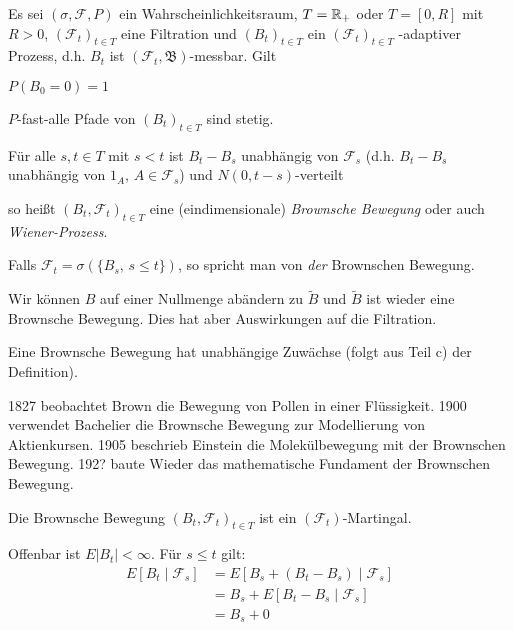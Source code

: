 \documentclass[a4paper,twoside,DIV15,BCOR12mm]{scrbook}
\newcommand{\cF}{\mathcal F}
\newcommand{\borel}{{\mathfrak B}}
\begin{document}
\begin{definition}
Es sei $(\sigma,\cF,P)$ ein Wahrscheinlichkeitsraum, $T=\mathbb{R}_+$ oder $T=[0,R]$ mit $R>0$, $(\cF_t)_{t\in T}$ eine Filtration und $(B_t)_{t\in T}$ ein $(\cF_t)_{t\in T}$
-adaptiver Prozess, d.h. $B_t$ ist $(\cF_t,\borel)$-messbar. Gilt 
\begin{enuma}
\item $P(B_0=0)=1$
\item $P$-fast-alle Pfade von $(B_t)_{t\in T}$ sind stetig.
\item Für alle $s,t\in T$ mit $s<t$ ist $B_t-B_s$ unabhängig von $\cF_s$ (d.h. $B_t-B_s$ unabhängig von $1_A$, $A\in \cF_s$) und $N(0,t-s)$-verteilt
\end{enuma}
so heißt $(B_t,\cF_t)_{t\in T}$ eine (eindimensionale) \emph{Brownsche Bewegung} oder auch \emph{Wiener-Prozess}.
\end{definition}

\begin{bemerkung}
\begin{enuma}
\item Falls $\cF_t = \sigma(\{B_s,\, s\le t\})$, so spricht man von \emph{der} Brownschen Bewegung.
\item Wir können $B$ auf einer Nullmenge abändern zu $\tilde B$ und $\tilde B$ ist wieder eine Brownsche Bewegung. Dies hat aber Auswirkungen auf die Filtration.
\item Eine Brownsche Bewegung hat unabhängige Zuwächse (folgt aus Teil c) der Definition).
\item 1827 beobachtet Brown die Bewegung von Pollen in einer Flüssigkeit. 1900 verwendet Bachelier die Brownsche Bewegung zur Modellierung von Aktienkursen. 1905 beschrieb Einstein die Molekülbewegung mit der Brownschen Bewegung. 192? baute Wieder das mathematische Fundament der Brownschen Bewegung.
\end{enuma}
\end{bemerkung}

\begin{lemma}
Die Brownsche Bewegung $(B_t,\cF_t)_{t\in T}$ ist ein $(\cF_t)$-Martingal.
\end{lemma}

\begin{beweis}
Offenbar ist $E|B_t|<\infty$. Für $s\le t$ gilt:
\begin{align*}
E[B_t\mid \cF_s] &= E[B_s + (B_t - B_s) \mid \cF_s] \\
&= B_s + E[B_t-B_s \mid \cF_s] \\
&= B_s + 0
\end{align*}
\end{beweis}
\end{document}
